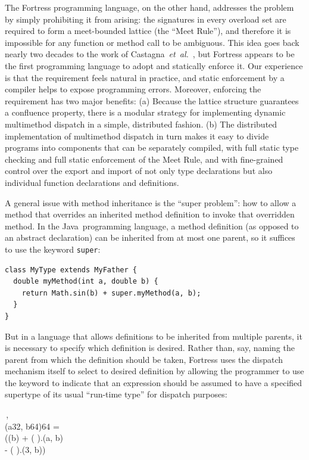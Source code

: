 The Fortress programming language, on the other hand, addresses the problem by
simply prohibiting it from arising: the signatures in every overload set are
required to form a meet-bounded lattice (the ``Meet Rule''), and therefore it is impossible for any
function or method call to be ambiguous.  This idea goes back nearly two decades
to the work of
Castagna~\emph{et~al.}~\cite{LFP92-OVERLOADED-FUNCTIONS-WITH-SUBTYPING}, but
Fortress appears to be the first programming language to adopt and statically
enforce it.
Our experience is that the requirement feels natural in practice,
and static enforcement by a compiler helps to expose programming errors.
Moreover, enforcing the requirement has two major benefits:
(a) Because the lattice structure guarantees a confluence property,
there is a modular strategy for implementing dynamic multimethod dispatch
in a simple, distributed fashion.
(b) The distributed implementation of multimethod dispatch in turn
makes it easy to divide programs into components that can be separately
compiled, with full static type checking and full static enforcement
of the Meet Rule, and with fine-grained control over the export and
import of not only type declarations but also individual function
declarations and definitions.

A general issue with method inheritance is the ``super problem'': how to allow a
method that overrides an inherited method definition to invoke that overridden
method.  In the Java\texttrademark\ programming language, a method definition
(as opposed to an abstract declaration) can be inherited from at most one
parent, so it suffices to use the keyword {\tt super}:
\begin{verbatim}
class MyType extends MyFather {
  double myMethod(int a, double b) {
    return Math.sin(b) + super.myMethod(a, b);
  }
}
\end{verbatim}
But in a language that allows definitions to be inherited from multiple parents,
it is necessary to specify which definition is desired.  Rather than, say,
naming the parent from which the definition should be taken, Fortress uses the
dispatch mechanism itself to select to desired definition by allowing the
programmer to use the keyword  to indicate that an expression should be assumed
to have a specified supertype of its usual ``run-time type'' for dispatch
purposes:
\begin{FortressCode}
   \lbrace\,, \,\rbrace \\
\2\+(a\COLON {}32, b\COLON {}64)\COLON {}64 = \\
  \2\+(\sin(b) + (  ).(a, b) \\
    \3 \+- (  ).(3, b))\-\-\- \\
\end{FortressCode}

